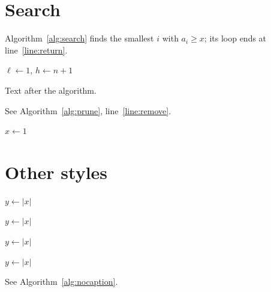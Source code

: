 \documentclass{article}
\begin{document}
\section{Search}
Algorithm~\ref{alg:search} finds the smallest $i$ with $a_i \ge x$; its
loop ends at line~\ref{line:return}.
\begin{algorithm}
\caption{Binary search}\label{alg:search}
$\ell \gets 1$, $h \gets n + 1$
\label{line:return}\;
\end{algorithm}
Text after the algorithm.

\begin{algorithm}[H]
\DontPrintSemicolon
{}
\caption{An \texttt{[H]} algorithm, its caption at the end}\label{alg:prune}
\end{algorithm}
See Algorithm~\ref{alg:prune}, line~\ref{line:remove}.

{\small
\begin{algorithm}[H]
$x \gets 1$\;
\caption{A small algorithm}
\end{algorithm}}

\section{Other styles}
{
\begin{algorithm}[H]
\caption{A plain algorithm}\label{alg:plain}
\end{algorithm}}
{
\begin{algorithm}[H]
\caption{A boxed algorithm}
$y \gets |x|$\;
\;
\end{algorithm}}
{
\begin{algorithm}[H]
$y \gets |x|$\;
\;
\caption{A boxruled algorithm}
\end{algorithm}}
{
\begin{algorithm}[H]
\caption{A plainruled algorithm}
$y \gets |x|$\;
\;
\end{algorithm}}
{
\begin{algorithm}[H]
\SetAlgoNoLine
\caption{A tworuled algorithm without lines}
\end{algorithm}}
{\noalgocaption
\begin{algorithm}[H]
\caption{A caption that is not shown}\label{alg:nocaption}
$y \gets |x|$\;
\end{algorithm}}
See Algorithm~\ref{alg:nocaption}.
\end{document}
